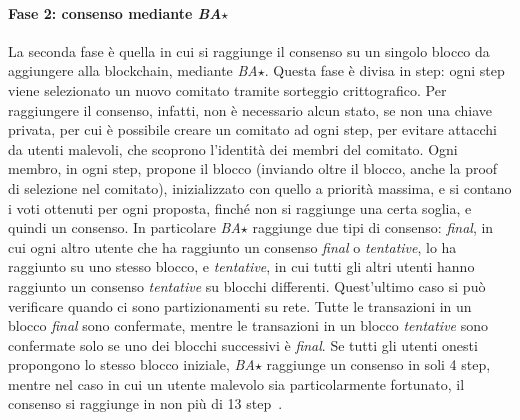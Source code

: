 \paragraph*{Fase 2: consenso mediante \emph{BA$\star$}}
La seconda fase è quella in cui si raggiunge il consenso su un singolo blocco da aggiungere alla blockchain, mediante \emph{BA$\star$}. Questa fase è divisa in step: ogni step viene selezionato un nuovo comitato tramite sorteggio crittografico. Per raggiungere il consenso, infatti, non è necessario alcun stato, se non una chiave privata, per cui è possibile creare un comitato ad ogni step, per evitare attacchi da utenti malevoli, che scoprono l'identità dei membri del comitato.
Ogni membro, in ogni step, propone il blocco (inviando oltre il blocco, anche la proof di selezione nel comitato), inizializzato con quello a priorità massima, e si contano i voti ottenuti per ogni proposta, finché non si raggiunge una certa soglia, e quindi un consenso. In particolare \emph{BA$\star$} raggiunge due tipi di consenso: \emph{final}, in cui ogni altro utente che ha raggiunto un consenso \emph{final} o \emph{tentative}, lo ha raggiunto su uno stesso blocco, e \emph{tentative}, in cui tutti gli altri utenti hanno raggiunto un consenso \emph{tentative} su blocchi differenti. Quest'ultimo caso si può verificare quando ci sono partizionamenti su rete. Tutte le transazioni in un blocco \emph{final} sono confermate, mentre le transazioni in un blocco \emph{tentative} sono confermate solo se uno dei blocchi successivi è \emph{final}.
Se tutti gli utenti onesti propongono lo stesso blocco iniziale, \emph{BA$\star$} raggiunge un consenso in soli 4 step, mentre nel caso in cui un utente malevolo sia particolarmente fortunato, il consenso si raggiunge in non più di 13 step~\cite{chen2019algorand}.

